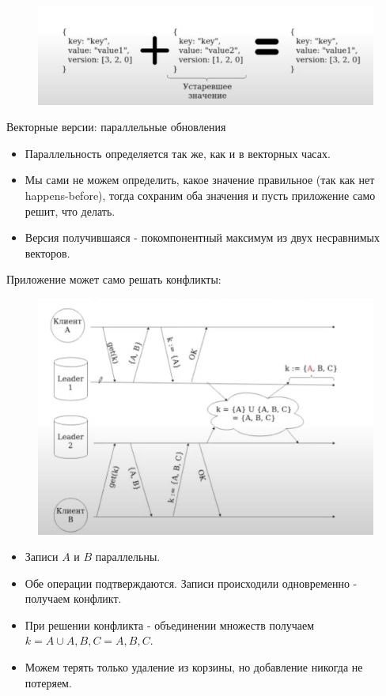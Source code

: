 \begin{figure}[h]
    \centering
    \includegraphics[scale = 0.5]{../assets/2.png}
    \caption{}
\end{figure}
\begin{definition}
  Векторные версии: параллельные обновления
\end{definition}
\begin{itemize}
  \item Параллельность определяется так же, как и в векторных часах.
  \item Мы сами не можем определить, какое значение правильное (так как нет happens-before), тогда сохраним оба значения и пусть приложение само решит, что делать.
  \item Версия получившаяся - покомпонентный максимум из двух несравнимых векторов.
\end{itemize}
\begin{example}
  Приложение может само решать конфликты:\\
  \begin{figure}[h]
      \centering
      \includegraphics[scale = 0.5]{../assets/4.png}
      \caption{}
  \end{figure}
  \begin{itemize}
    \item Записи $A$ и $B$ параллельны.
    \item Обе операции подтверждаются. Записи происходили одновременно - получаем конфликт.
    \item При решении конфликта - объединении множеств получаем $k = {A} \cup {A, B, C} = {A, B, C}.$
    \item Можем терять только удаление из корзины, но добавление никогда не потеряем.
  \end{itemize}
\end{example}
